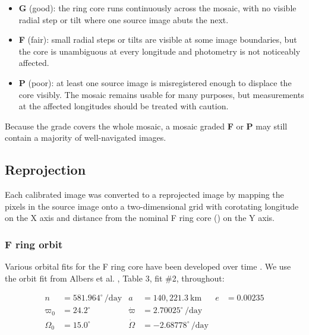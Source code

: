 \begin{itemize}
\item \textbf{G} (good): the ring core runs continuously across the mosaic, with no visible radial step or tilt where one source image abuts the next.
\item \textbf{F} (fair): small radial steps or tilts are visible at some image boundaries, but the core is unambiguous at every longitude and photometry is not noticeably affected.
\item \textbf{P} (poor): at least one source image is misregistered enough to displace the core visibly. The mosaic remains usable for many purposes, but measurements at the affected longitudes should be treated with caution.
\end{itemize}

Because the grade covers the whole mosaic, a mosaic graded \textbf{F} or \textbf{P} may still contain a majority of well-navigated images.


\subsection{Reprojection}
\label{sec:reprojection}

Each calibrated image was converted to a reprojected image by mapping the pixels in the source image onto a two-dimensional grid with corotating longitude on the X axis and distance from the nominal F ring core (\dr{}) on the Y axis.


\subsubsection{F ring orbit}
\label{sec:f-ring-orbit}

Various orbital fits for the F ring core have been developed over time . We use the orbit fit from Albers et al. , Table 3, fit \#2, throughout:

\begin{equation*}
\begin{aligned}
n &= 581.964^{\circ}\,\mathrm{/day} & a &= 140{,}221.3\ \mathrm{km} & e &= 0.00235 \\
\varpi_{0} &= 24.2^{\circ} & \dot{\varpi} &= 2.70025^{\circ}\,\mathrm{/day} \\
\Omega_{0} &= 15.0^{\circ} & \dot{\Omega} &= -2.68778^{\circ}\,\mathrm{/day}
\end{aligned}
\end{equation*}

